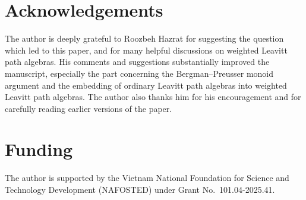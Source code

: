 \documentclass{article}
\theoremstyle{definition}
\begin{document}
\section*{Acknowledgements}
The author is deeply grateful to Roozbeh Hazrat for suggesting the question which led to this paper, and for many helpful discussions on weighted Leavitt path algebras. His comments and suggestions substantially improved the manuscript, especially the part concerning the Bergman--Preusser monoid argument and the embedding of ordinary Leavitt path algebras into weighted Leavitt path algebras. The author also thanks him for his encouragement and for carefully reading earlier versions of the paper. 

\section*{Funding}
The author is supported by the Vietnam National Foundation for Science and Technology Development (NAFOSTED) under Grant No.~101.04-2025.41.
\end{document}
